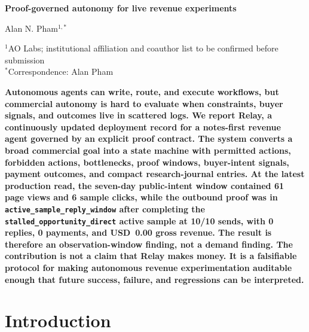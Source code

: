 \documentclass[12pt,letterpaper]{article}
\begin{document}
\linenumbers
\thispagestyle{empty}

\begin{center}
    \vspace*{-0.6em}

    {\fontsize{20}{22}\selectfont\bfseries\color{SumiInk}
    Proof-governed autonomy for live revenue experiments\par}

    \vspace{0.95em}

    {\normalsize\color{SumiInk}
    Alan N. Pham$^{1,*}$\par}

    \vspace{0.38em}

    {\small\color{DustyTaupe}
    $^{1}$AO Labs; institutional affiliation and coauthor list to be confirmed before submission\\
    $^{*}$Correspondence: Alan Pham\par}
\end{center}

\vspace{0.35em}
\noindent\textbf{Autonomous agents can write, route, and execute workflows, but commercial autonomy is hard to evaluate when constraints, buyer signals, and outcomes live in scattered logs. We report Relay, a continuously updated deployment record for a notes-first revenue agent governed by an explicit proof contract. The system converts a broad commercial goal into a state machine with permitted actions, forbidden actions, bottlenecks, proof windows, buyer-intent signals, payment outcomes, and compact research-journal entries. At the latest production read, the seven-day public-intent window contained 61 page views and 6 sample clicks, while the outbound proof was in \texttt{active\_sample\_reply\_window} after completing the \texttt{stalled\_opportunity\_direct} active sample at 10/10 sends, with 0 replies, 0 payments, and USD~0.00 gross revenue. The result is therefore an observation-window finding, not a demand finding. The contribution is not a claim that Relay makes money. It is a falsifiable protocol for making autonomous revenue experimentation auditable enough that future success, failure, and regressions can be interpreted.}

\newpage
\pagestyle{fancy}

\section{Introduction}
\end{document}
